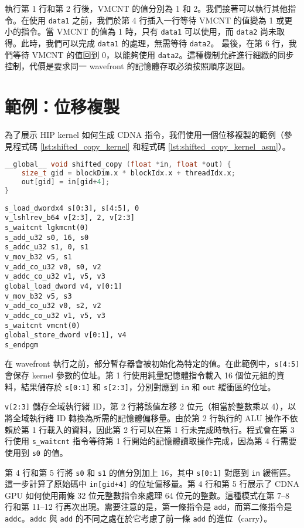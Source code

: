 執行第 1 行和第 2 行後，VMCNT 的值分別為 1 和 2。我們接著可以執行其他指令。在使用 \lstinline|data1| 之前，我們於第 4 行插入一行等待 VMCNT 的值變為 1 或更小的指令。當 VMCNT 的值為 1 時，只有 \lstinline|data1| 可以使用，而 \lstinline|data2| 尚未取得。此時，我們可以完成 \lstinline|data1| 的處理，無需等待 \lstinline|data2|。
最後，在第 6 行，我們等待 VMCNT 的值回到 0，以能夠使用 \lstinline|data2|。這種機制允許進行細緻的同步控制，代價是要求同一 wavefront 的記憶體存取必須按照順序返回。


\section{範例：位移複製}
為了展示 HIP kernel 如何生成 CDNA 指令，我們使用一個位移複製的範例（參見程式碼 \ref{lst:shifted_copy_kernel} 和程式碼 \ref{lst:shifted_copy_kernel_asm}）。

\begin{lstlisting}[caption={位移複製的 kernel}, label={lst:shifted_copy_kernel}, language={C++}]
__global__ void shifted_copy (float *in, float *out) {
    size_t gid = blockDim.x * blockIdx.x + threadIdx.x;
    out[gid] = in[gid+4];
}
\end{lstlisting}

\begin{lstlisting}[caption={從位移複製 kernel 生成的組合語言程式碼}, label={lst:shifted_copy_kernel_asm}]
s_load_dwordx4 s[0:3], s[4:5], 0
v_lshlrev_b64 v[2:3], 2, v[2:3]
s_waitcnt lgkmcnt(0)
s_add_u32 s0, 16, s0
s_addc_u32 s1, 0, s1
v_mov_b32 v5, s1
v_add_co_u32 v0, s0, v2
v_addc_co_u32 v1, v5, v3
global_load_dword v4, v[0:1]
v_mov_b32 v5, s3
v_add_co_u32 v0, s2, v2
v_addc_co_u32 v1, v5, v3
s_waitcnt vmcnt(0)
global_store_dword v[0:1], v4
s_endpgm
\end{lstlisting}

在 wavefront 執行之前，部分暫存器會被初始化為特定的值。在此範例中，\lstinline|s[4:5]| 會保存 kernel 參數的位址。第 1 行使用純量記憶體指令載入 16 個位元組的資料，結果儲存於 \lstinline|s[0:1]| 和 \lstinline|s[2:3]|，分別對應到 \lstinline|in| 和 \lstinline|out| 緩衝區的位址。

\lstinline|v[2:3]| 儲存全域執行緒 ID，第 2 行將該值左移 2 位元（相當於整數乘以 4），以將全域執行緒 ID 轉換為所需的記憶體偏移量。由於第 2 行執行的 ALU 操作不依賴於第 1 行載入的資料，因此第 2 行可以在第 1 行未完成時執行。程式會在第 3 行使用 \lstinline|s_waitcnt| 指令等待第 1 行開始的記憶體讀取操作完成，因為第 4 行需要使用到 \lstinline|s0| 的值。

第 4 行和第 5 行將 \lstinline|s0| 和 \lstinline|s1| 的值分別加上 16，其中 \lstinline|s[0:1]| 對應到 \lstinline|in| 緩衝區。這一步計算了原始碼中 \lstinline|in[gid+4]| 的位址偏移量。第 4 行和第 5 行展示了 CDNA GPU 如何使用兩條 32 位元整數指令來處理 64 位元的整數。這種模式在第 7–8 行和第 11–12 行再次出現。需要注意的是，第一條指令是 \lstinline|add|，而第二條指令是 \lstinline|addc|。\lstinline|addc| 與 \lstinline|add| 的不同之處在於它考慮了前一條 \lstinline|add| 的進位（carry）。

